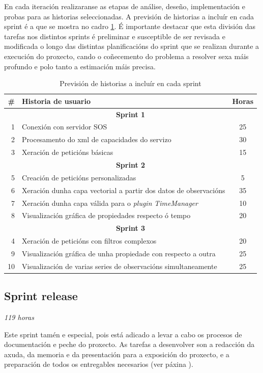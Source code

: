 En cada iteración realizaranse as etapas de análise, deseño, implementación e probas para as historias seleccionadas. A previsión de historias a incluír en cada sprint é a que se mostra no cadro \ref{tab:previsionSprints}. É importante destacar que esta división das tarefas nos distintos sprints é preliminar e susceptible de ser revisada e modificada o longo das distintas planificacións do sprint que se realizan durante a execución do proxecto, cando o coñecemento do problema a resolver sexa máis profundo e polo tanto a estimación máis precisa.

\begin{table}
\centering
\begin{tabularx}{\textwidth}{rXc} \toprule
	\# & Historia de usuario & Horas \\
	\midrule
	\multicolumn{3}{c}{\textbf{Sprint 1}} \\
	1 & Conexión con servidor SOS & 25 \\
	2 & Procesamento do xml de capacidades do servizo & 30 \\
	3 & Xeración de peticións básicas & 15 \\
	\multicolumn{3}{c}{\textbf{Sprint 2}} \\
	5 & Creación de peticións personalizadas & 5 \\
	6 & Xeración dunha capa vectorial a partir dos datos de observacións & 35\\
	7 & Xeración dunha capa válida para o \emph{plugin} \emph{TimeManager} & 10\\
	8 & Visualización gráfica de propiedades respecto ó tempo & 20\\
	\multicolumn{3}{c}{\textbf{Sprint 3}} \\
	4 & Xeración de peticións con filtros complexos & 20 \\
	9 & Visualización gráfica de unha propiedade con respecto a outra & 25\\
	10 & Visualización de varias series de observacións simultaneamente & 25\\
	\bottomrule
\end{tabularx}
\caption{Previsión de historias a incluír en cada sprint}
\label{tab:previsionSprints}
\end{table}

\subsection{Sprint release}
\textit{119 horas}

Este sprint tamén e especial, pois está adicado a levar a cabo os procesos de documentación e peche do proxecto. As tarefas a desenvolver son a redacción da axuda, da memoria e da presentación para a exposición do proxecto, e a preparación de todos os entregables necesarios (ver páxina \pageref{sss:entregables}).

